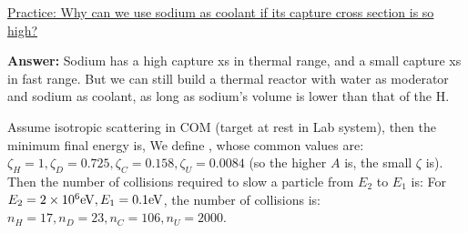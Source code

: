 \documentclass{school-22.211-notes}
\begin{document}
\uline{Practice: Why can we use sodium as coolant if its capture cross section is so high?}  

\textbf{Answer:} Sodium has a high capture xs in thermal range, and a small capture xs in fast range. But we can still build a thermal reactor with water as moderator and sodium as coolant, as long as sodium's volume is lower than that of the H. 


\clearpage
Assume isotropic scattering in COM (target at rest in Lab system), then the minimum final energy is,
We define ,
whose common values are: $\zeta_{H} = 1, \zeta_D = 0.725, \zeta_C = 0.158, \zeta_U = 0.0084$ (so the higher $A$ is, the small $\zeta$ is). Then the number of collisions required to slow a particle from $E_2$ to $E_1$ is: 
For $E_2 = 2\times 10^6 \mathrm{eV}, E_1 = 0.1 \mathrm{eV}$, the number of collisions is: $n_H = 17, n_D = 23, n_C = 106, n_U = 2000$. 
\end{document}
